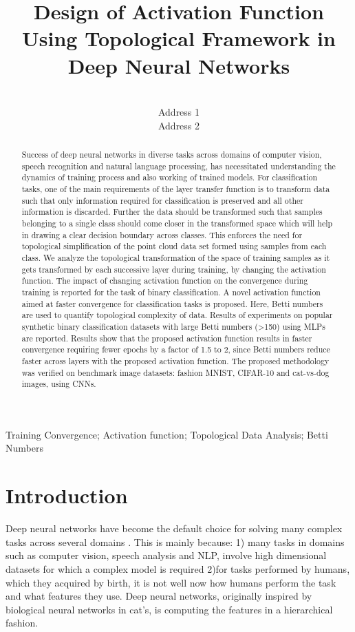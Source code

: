 \documentclass[wcp]{jmlr}
\title[Topological Framework for Activation function in DNN]{Design of Activation Function Using Topological Framework  in Deep Neural Networks}
\author{\Name{Author Name1} \Email{abc@sample.com}\\
  \addr Address 1
  \AND
  \Name{Author Name2} \Email{xyz@sample.com}\\
  \addr Address 2
 }
\begin{document}
\maketitle

\begin{abstract}
Success of deep neural networks in diverse tasks across domains of computer vision, speech recognition and natural language processing, has necessitated understanding the dynamics of training process and also working of trained models. For classification tasks, one of the main requirements of the layer transfer function is to transform data such that only information required for classification is preserved and all other information is discarded.  Further the data should be transformed such that samples belonging to a single class should come closer in the transformed space which will help in drawing a clear decision boundary across classes. This enforces the need for topological simplification of the point cloud data set formed using samples from each class. We analyze the topological transformation of the space of training samples as it gets transformed by each successive layer during training, by changing the activation function. The impact of changing activation function on the convergence during training is reported for the task of binary classification.  A novel activation function aimed at faster convergence for classification tasks is proposed.  Here, Betti numbers are used to quantify topological complexity of data. Results of experiments on popular synthetic binary classification datasets with large Betti numbers (>150) using MLPs are reported. Results show that the proposed activation function results in faster convergence requiring fewer epochs by a factor of 1.5  to 2, since Betti numbers reduce faster across layers with the proposed activation function. The proposed methodology was verified on benchmark image datasets: fashion MNIST, CIFAR-10 and cat-vs-dog images, using CNNs.
\end{abstract}
\begin{keywords}
Training Convergence; Activation function; Topological Data Analysis; Betti Numbers
\end{keywords}

\section{Introduction}

Deep neural networks have become the default choice for solving many  complex tasks across several domains \cite{alexnet, yolo, chen2017deeplab, ronneberger2015u}. This is mainly because: 1) many tasks in domains such as computer vision, speech analysis and NLP, involve high dimensional datasets for which a complex model is required 2)for tasks performed by humans, which they acquired by birth, it is not well now how humans perform the task and what features they use. Deep neural networks, originally inspired by biological neural networks in cat’s, is computing the features in a hierarchical fashion.
\end{document}
